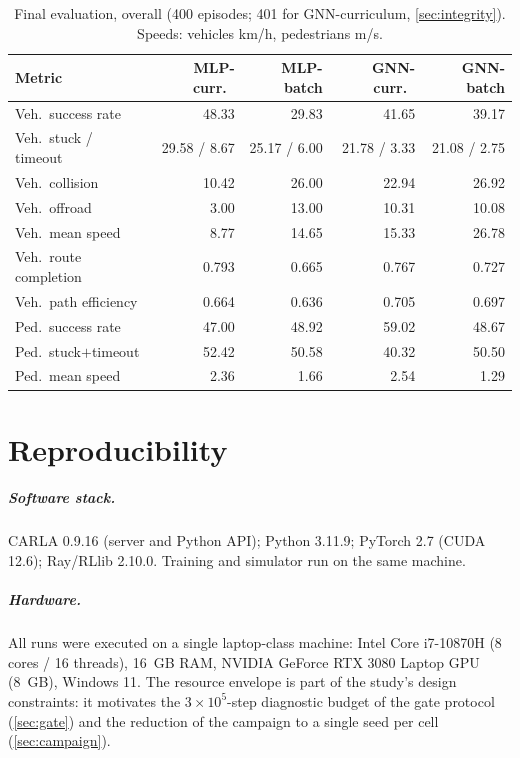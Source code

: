 \begin{table}[h]
  \centering\small
  \caption{Final evaluation, overall (400 episodes; 401 for
  GNN-curriculum, \cref{sec:integrity}). Speeds: vehicles km/h,
  pedestrians m/s.}
  \begin{tabular}{@{}lrrrr@{}}
    \toprule
    Metric & MLP-curr.\ & MLP-batch & GNN-curr.\ & GNN-batch \\
    \midrule
    Veh.\ success rate & 48.33 & 29.83 & 41.65 & 39.17 \\
    Veh.\ stuck / timeout & 29.58 / 8.67 & 25.17 / 6.00 & 21.78 / 3.33 & 21.08 / 2.75 \\
    Veh.\ collision & 10.42 & 26.00 & 22.94 & 26.92 \\
    Veh.\ offroad & 3.00 & 13.00 & 10.31 & 10.08 \\
    Veh.\ mean speed & 8.77 & 14.65 & 15.33 & 26.78 \\
    Veh.\ route completion & 0.793 & 0.665 & 0.767 & 0.727 \\
    Veh.\ path efficiency & 0.664 & 0.636 & 0.705 & 0.697 \\
    \addlinespace
    Ped.\ success rate & 47.00 & 48.92 & 59.02 & 48.67 \\
    Ped.\ stuck$+$timeout & 52.42 & 50.58 & 40.32 & 50.50 \\
    Ped.\ mean speed & 2.36 & 1.66 & 2.54 & 1.29 \\
    \bottomrule
  \end{tabular}
\end{table}

\chapter{Reproducibility}
\label{app:repro}

\paragraph{Software stack.}
CARLA 0.9.16 (server and Python API); Python 3.11.9; PyTorch 2.7
(CUDA 12.6); Ray/RLlib 2.10.0. Training and simulator run on the same
machine.

\paragraph{Hardware.}
All runs were executed on a single laptop-class machine: Intel Core
i7-10870H (8 cores / 16 threads), \SI{16}{GB} RAM, NVIDIA GeForce RTX
3080 Laptop GPU (\SI{8}{GB}), Windows 11. The resource envelope is part
of the study's design constraints: it motivates the $3\times10^{5}$-step
diagnostic budget of the gate protocol (\cref{sec:gate}) and the
reduction of the campaign to a single seed per cell
(\cref{sec:campaign}).

